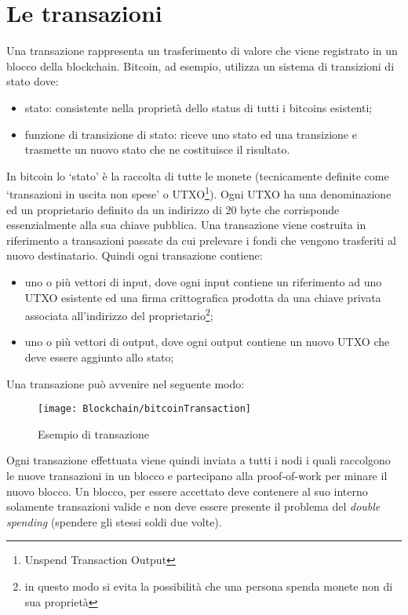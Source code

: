 \section{Le transazioni}
%
Una transazione rappresenta un trasferimento di valore che viene registrato in un blocco della blockchain. Bitcoin, ad esempio, utilizza un sistema di transizioni di stato dove:
\begin{itemize}
	\item stato: consistente nella proprietà dello status di tutti i bitcoins esistenti;
	\item funzione di transizione di stato: riceve uno stato ed una transizione e trasmette un nuovo stato che ne costituisce il risultato.
\end{itemize}
In bitcoin lo \enquote*{stato} è la raccolta di tutte le monete (tecnicamente definite come \enquote*{transazioni in uscita non spese} o UTXO\footnote{Unspend Transaction Output}). Ogni UTXO ha una denominazione ed un proprietario definito da un indirizzo di 20 byte che corrisponde essenzialmente alla sua chiave pubblica. Una transazione viene costruita in riferimento a transazioni passate da cui prelevare i fondi che vengono trasferiti al nuovo destinatario. Quindi ogni transazione contiene:
\begin{itemize}
	\item uno o più vettori di input, dove ogni input contiene un riferimento ad uno UTXO esistente ed una firma crittografica prodotta da una chiave privata associata all'indirizzo del proprietario\footnote{in questo modo si evita la possibilità che una persona spenda monete non di sua proprietà};
	\item uno o più vettori di output, dove ogni output contiene un nuovo UTXO che deve essere aggiunto allo stato;
\end{itemize}
Una transazione può avvenire nel seguente modo:
\begin{center}
	\begin{figure}[H]
		\centering
		\texttt{[image: Blockchain/bitcoinTransaction]}
		\caption{Esempio di transazione}
		\label{fig:esempio di transazione}
	\end{figure}
\end{center}
%
Ogni transazione effettuata viene quindi inviata a tutti i nodi i quali raccolgono le nuove transazioni in un blocco e partecipano alla proof-of-work per minare il nuovo blocco. Un blocco, per essere accettato deve contenere al suo interno solamente transazioni valide e non deve essere presente il problema del \emph{double spending} (spendere gli stessi soldi due volte).
%
